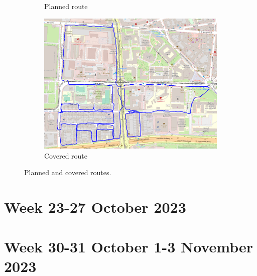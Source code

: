 \documentclass[a4paper,12pt]{article}
\begin{document}
\begin{enumerate}
\begin{figure}[H]
\begin{subfigure}{.90\textwidth}
			\caption{Planned route}
			\label{fig:a21}
		\end{subfigure}%
		\linebreak
		\begin{subfigure}{.90\textwidth}
			\centering
			\includegraphics[width=1\linewidth]{route_c21}
			\caption{Covered route}
			\label{fig:b21}
		\end{subfigure}
		\caption{Planned and covered routes.}
		\label{fig:fig21}
	\end{figure} 
\end{enumerate}
\section{Week 23-27 October 2023}

\section{Week 30-31 October 1-3 November 2023}
\end{document}
